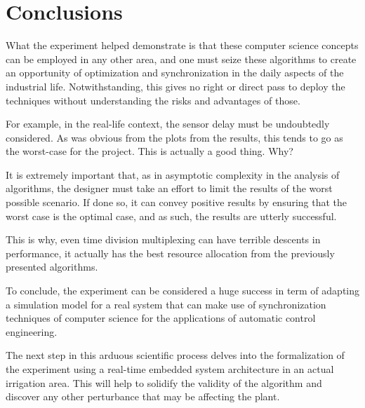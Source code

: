 \documentclass[12pt]{article}
\begin{document}
\section{Conclusions}

What the experiment helped demonstrate is that these computer science concepts can be employed in any other area, and one must seize these algorithms to create an opportunity of optimization and synchronization in the daily aspects of the industrial life. Notwithstanding, this gives no right or direct pass to deploy the techniques without understanding the risks and advantages of those.

For example, in the real-life context, the sensor delay must be undoubtedly considered. As was obvious from the plots from the results, this tends to go as the worst-case for the project. This is actually a good thing. Why?

It is extremely important that, as in asymptotic complexity in the analysis of algorithms, the designer must take an effort to limit the results of the worst possible scenario. If done so, it can convey positive results by ensuring that the worst case is the optimal case, and as such, the results are utterly successful.

This is why, even time division multiplexing can have terrible descents in performance, it actually has the best resource allocation from the previously presented algorithms.

To conclude, the experiment can be considered a huge success in term of adapting a simulation model for a real system that can make use of synchronization techniques of computer science for the applications of automatic control engineering.

The next step in this arduous scientific process delves into the formalization of the experiment using a real-time embedded system architecture in an actual irrigation area. This will help to solidify the validity of the algorithm and discover any other perturbance that may be affecting the plant.



\end{document}
